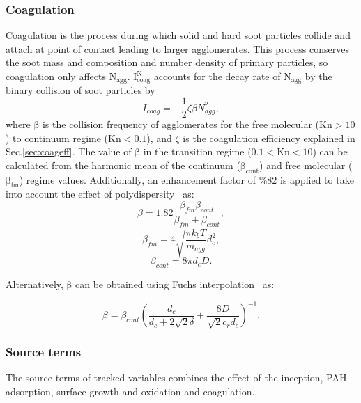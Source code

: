 \subsubsection{Coagulation}
\label{sec:monocoag}
Coagulation is the process during which solid and hard soot particles collide and attach at point of contact leading to larger agglomerates. This process conserves the soot mass and composition and number density of primary particles, so coagulation only affects $\mathrm{N_{agg}}$. $\mathrm{I^N_{coag}}$ accounts for the decay rate of $\mathrm{N_{agg}}$ by the binary collision of soot particles by
\begin{equation}
	I_{coag} = -\frac{1}{2}\zeta\beta N^2_{agg}
	\label{eqn:Icoag},
\end{equation}
where $\mathrm{\beta}$ is the collision frequency of agglomerates for the free molecular ($\mathrm{Kn>10}$) to continuum regime ($\mathrm{Kn<0.1}$), and $\zeta$ is the coagulation efficiency explained in Sec.\ref{sec:coageff}. The value of $\mathrm{\beta}$ in the transition regime ($\mathrm{0.1<Kn<10}$) can be calculated from the harmonic mean of the continuum ($\mathrm{\beta_{cont}}$) and free molecular ($\mathrm{\beta_{fm}}$) regime values. Additionally, an enhancement factor of \%82 is applied to take into account the effect of polydispersity~\citep{kelesidis2021self} as:
\begin{equation}
	\beta = 1.82\frac{\beta_{fm}\beta_{cont}}{\beta_{fm}+\beta_{cont}}
	\label{eqn:betahmmono},
\end{equation}
\begin{equation}
	\beta_{fm} = 4\sqrt{\frac{\pi k_b T}{m_{agg}}} d^2_c
	\label{eqn:betafmmono},
\end{equation}
\begin{equation}
	\beta_{cont} = 8\pi d_c D
	\label{eqn:betacontmono}.
\end{equation}

Alternatively, $\mathrm{\beta}$ can be obtained using Fuchs interpolation~\citep{fuchs1965mechanics} as:

\begin{equation}
	\beta = \beta_{cont}
	\left(
		\frac{d_c}{d_c+2\sqrt{2}\delta} +
		\frac{8D}{\sqrt{2}c_r d_c}
	\right)^{-1}
	\label{eqn:betafuchsmono}.
\end{equation}

\subsubsection{Source terms}
The source terms of tracked variables combines the effect of the inception, PAH adsorption, surface growth and oxidation and coagulation.

